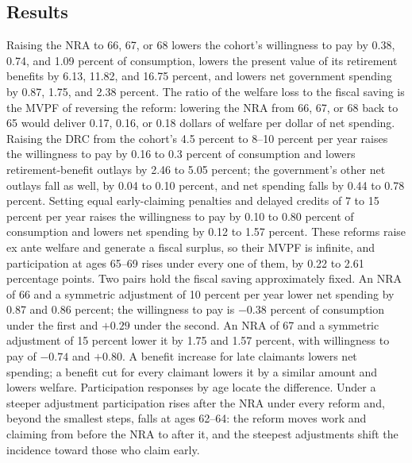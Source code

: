 \subsection{Results}\label{subsec:results}

Raising the NRA to 66, 67, or 68 lowers the cohort's willingness to pay by 0.38, 0.74, and 1.09 percent of consumption, lowers the present value of its retirement benefits by 6.13, 11.82, and 16.75 percent, and lowers net government spending by 0.87, 1.75, and 2.38 percent. %
The ratio of the welfare loss to the fiscal saving is the MVPF of reversing the reform: lowering the NRA from 66, 67, or 68 back to 65 would deliver 0.17, 0.16, or 0.18 dollars of welfare per dollar of net spending. %
Raising the DRC from the cohort's 4.5 percent to 8--10 percent per year raises the willingness to pay by 0.16 to 0.3 percent of consumption and lowers retirement-benefit outlays by 2.46 to 5.05 percent; the government's other net outlays fall as well, by 0.04 to 0.10 percent, and net spending falls by 0.44 to 0.78 percent. %
Setting equal early-claiming penalties and delayed credits of 7 to 15 percent per year raises the willingness to pay by 0.10 to 0.80 percent of consumption and lowers net spending by 0.12 to 1.57 percent. %
These reforms raise ex ante welfare and generate a fiscal surplus, so their MVPF is infinite, and participation at ages 65--69 rises under every one of them, by 0.22 to 2.61 percentage points. %
Two pairs hold the fiscal saving approximately fixed. An NRA of 66 and a symmetric adjustment of 10 percent per year lower net spending by 0.87 and 0.86 percent; the willingness to pay is $-0.38$ percent of consumption under the first and $+0.29$ under the second. %
An NRA of 67 and a symmetric adjustment of 15 percent lower it by 1.75 and 1.57 percent, with willingness to pay of $-0.74$ and $+0.80$. %
A benefit increase for late claimants lowers net spending; a benefit cut for every claimant lowers it by a similar amount and lowers welfare. Participation responses by age locate the difference. Under a steeper adjustment participation rises after the NRA under every reform and, beyond the smallest steps, falls at ages 62--64: the reform moves work and claiming from before the NRA to after it, and the steepest adjustments shift the incidence toward those who claim early. %

